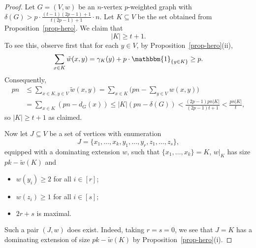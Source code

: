 \documentclass[10pt,a4paper]{article}
\theoremstyle{definition}
\newcommand{\cG}{\mathcal{G}}
\begin{document}
\begin{proof}
	Let $G=(V,w)$ be an $n$-vertex $p$-weighted graph with $\delta(G)>p\cdot\frac{(t-1)(2p-1)+1}{t(2p-1)+1}\cdot n$.	%
	Let $K \subseteq V$ be the set obtained from Proposition~\ref{prop-hero}. We claim that
	\begin{equation}\label{eq-K}
		|K|\ge t+1.
	\end{equation}
	To see this, observe first that for each $y\in V$, by Proposition~\ref{prop-hero}(ii), 
	$$\sum_{x \in K}\tilde{w}(x,y)=\gamma_K(y)+p\cdot\mathbbm{1}_{\{y\in K\}}\ge p.$$
	Consequently,
	\begin{align}
		pn &\leq \sum_{x \in K,y \in V}\tilde{w}(x,y) =\sum_{x \in K}\Big(pn-\sum_{y\in V}w(x,y)\Big)\nonumber\\
		&=\sum_{x \in K}(pn-d_G(x)) \leq |K|(pn-\delta(G)) < \frac{(2p-1)pn|K|}{(2p-1)t+1} < \frac{pn|K|}{t},\label{eq:ricecake}
	\end{align}
	so $|K| \geq t+1$ as claimed.
	
	Now let $J \subseteq V$ be a set of vertices with enumeration 
	$$J = \lbrace x_1,\ldots,x_k,y_1,\ldots,y_r,z_1,\ldots,z_s\rbrace,$$
	equipped with a dominating extension $w$, such that $\lbrace x_1,\ldots,x_k\rbrace = K$, $w|_K$ has size $pk-\tilde{w}(K)$ and 
	\begin{itemize}
		\item  $w(y_i) \geq 2$ for all $i \in [r]$;
		\item  $w(z_i) \geq 1$ for all $i \in [s]$;
		\item $2r+s$ is maximal.
	\end{itemize}
	Such a pair $(J,w)$ does exist. Indeed, taking $r=s=0$, we see that $J=K$ has a dominating extension of size $pk-\tilde{w}(K)$ by Proposition~\ref{prop-hero}(i).
	

\end{proof}
\end{document}
